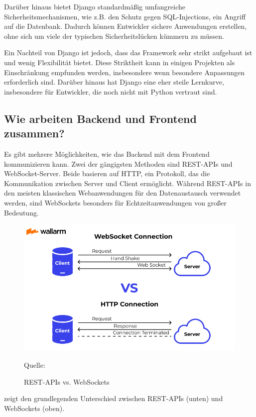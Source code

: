 \documentclass[biblatex]{lni}
\begin{document}
Darüber hinaus bietet Django standardmäßig umfangreiche Sicherheitsmechanismen,
wie z.B. den Schutz gegen SQL-Injections, ein Angriff auf die Datenbank.
Dadurch können Entwickler sichere Anwendungen erstellen,
ohne sich um viele der typischen Sicherheitslücken kümmern zu müssen.

Ein Nachteil von Django ist jedoch,
dass das Framework sehr strikt aufgebaut ist und wenig Flexibilität bietet.
Diese Striktheit kann in einigen Projekten als Einschränkung empfunden werden,
insbesondere wenn besondere Anpassungen erforderlich sind.
Darüber hinaus hat Django eine eher steile Lernkurve, insbesondere für Entwickler, die noch nicht mit Python vertraut sind.

\subsection{Wie arbeiten Backend und Frontend zusammen?}

Es gibt mehrere Möglichkeiten, wie das Backend mit dem Frontend kommunizieren kann.
Zwei der gängigsten Methoden sind REST-APIs und WebSocket-Server.
Beide basieren auf HTTP, ein Protokoll, das die Kommunikation zwischen Server und Client ermöglicht.
Während REST-APIs in den meisten klassischen Webanwendungen für den Datenaustausch verwendet werden,
sind WebSockets besonders für Echtzeitanwendungen von großer Bedeutung.

\begin{figure}
  \centering
  \includegraphics[width=.8\textwidth]{communication}
  \caption{REST-APIs vs. WebSockets}
  \label{fig:communication}
  \vspace{-0.3cm}
  \begin{center}
    \footnotesize Quelle: \cite{WebCon}
  \end{center}
\end{figure}

 zeigt den grundlegenden Unterschied zwischen REST-APIs (unten) und WebSockets (oben).
\end{document}
